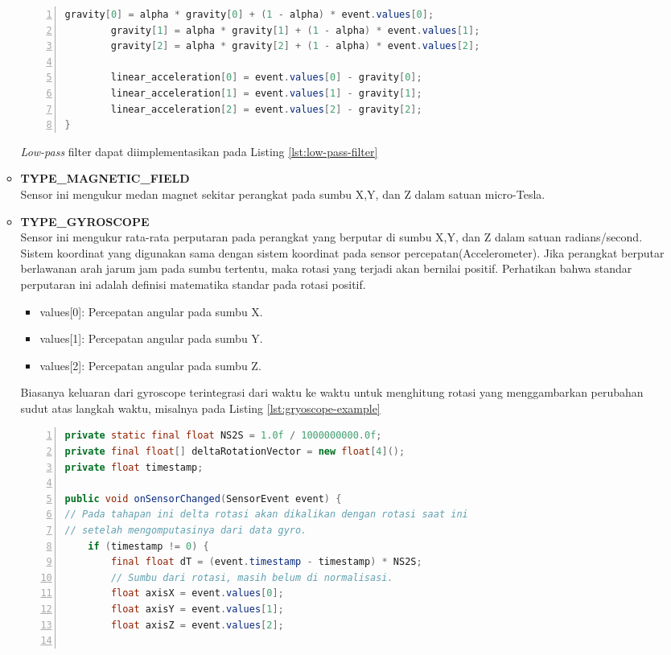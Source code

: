 \documentclass[a4paper,twoside]{article}
\begin{document}
\begin{enumerate}
\begin{itemize}
\begin{lstlisting}[language=java,numbers=left,breaklines=true,caption={Implementasi \textit{low-pass} filter},label={lst:low-pass-filter},language=java]
		gravity[0] = alpha * gravity[0] + (1 - alpha) * event.values[0];
		gravity[1] = alpha * gravity[1] + (1 - alpha) * event.values[1];
		gravity[2] = alpha * gravity[2] + (1 - alpha) * event.values[2];

		linear_acceleration[0] = event.values[0] - gravity[0];
		linear_acceleration[1] = event.values[1] - gravity[1];
		linear_acceleration[2] = event.values[2] - gravity[2];
}
\end{lstlisting}
\textit{Low-pass} filter dapat diimplementasikan pada Listing \ref{lst:low-pass-filter}\\
\item \textbf{TYPE\_MAGNETIC\_FIELD}\\
Sensor ini mengukur medan magnet sekitar perangkat pada sumbu X,Y, dan Z dalam satuan micro-Tesla.\\
\item \textbf{TYPE\_GYROSCOPE}\\
Sensor ini mengukur rata-rata perputaran pada perangkat yang berputar di sumbu X,Y, dan Z dalam satuan radians/second. Sistem koordinat yang digunakan sama dengan sistem koordinat pada sensor percepatan(Accelerometer). Jika perangkat berputar berlawanan arah jarum jam pada sumbu tertentu, maka rotasi yang terjadi akan bernilai positif. Perhatikan bahwa standar perputaran ini adalah definisi matematika standar pada rotasi positif.
\begin{itemize}
	\item values[0]: Percepatan angular pada sumbu X.
	\item values[1]: Percepatan angular pada sumbu Y.
	\item values[2]: Percepatan angular pada sumbu Z.
\end{itemize}
Biasanya keluaran dari gyroscope terintegrasi dari waktu ke waktu untuk menghitung rotasi yang menggambarkan perubahan sudut atas langkah waktu, misalnya pada Listing \ref{lst:gryoscope-example}

\begin{lstlisting}[language=java,numbers=left,breaklines=true,caption=contoh implementasi gyroscope,label={lst:gryoscope-example}]
private static final float NS2S = 1.0f / 1000000000.0f;
private final float[] deltaRotationVector = new float[4]();
private float timestamp;

public void onSensorChanged(SensorEvent event) {
// Pada tahapan ini delta rotasi akan dikalikan dengan rotasi saat ini
// setelah mengomputasinya dari data gyro.
	if (timestamp != 0) {
		final float dT = (event.timestamp - timestamp) * NS2S;
		// Sumbu dari rotasi, masih belum di normalisasi.
		float axisX = event.values[0];
		float axisY = event.values[1];
		float axisZ = event.values[2];


\end{lstlisting}
\end{itemize}
\end{enumerate}
\end{document}
